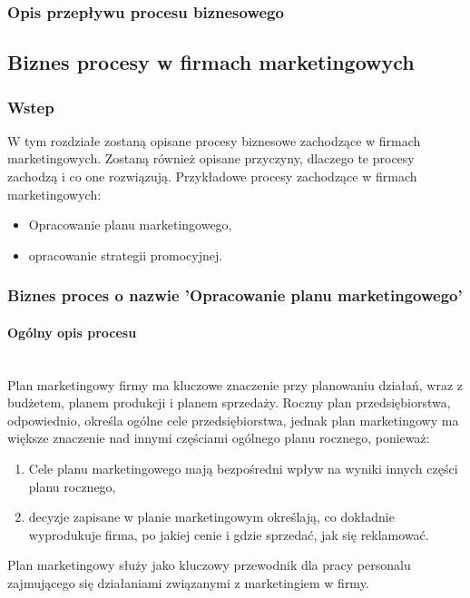 \documentclass[a4paper, 12pt]{article}
\begin{document}
\subsubsection{Opis przepływu procesu biznesowego}






\subsection{Biznes procesy w firmach marketingowych}
\subsubsection{Wstep}
\hspace*{1 cm} W tym rozdziałe zostaną opisane procesy biznesowe zachodzące w firmach marketingowych. Zostaną również opisane przyczyny, dlaczego te procesy zachodzą i co one rozwiązują. Przykładowe procesy zachodzące w firmach marketingowych:
\begin{itemize}
	\item Opracowanie planu marketingowego,
	\item opracowanie strategii promocyjnej.
\end{itemize}
\subsubsection{Biznes proces o nazwie 'Opracowanie planu marketingowego'}
\paragraph{Ogólny opis procesu}\mbox{}\\
\hspace*{1 cm}Plan marketingowy firmy ma kluczowe znaczenie przy planowaniu działań, wraz z budżetem, planem produkcji i planem sprzedaży. Roczny plan przedsiębiorstwa, odpowiednio, określa ogólne cele przedsiębiorstwa, jednak plan marketingowy ma większe znaczenie nad innymi częściami ogólnego planu rocznego, ponieważ:
\begin{enumerate}
	\item Cele planu marketingowego mają bezpośredni wpływ na wyniki innych części planu rocznego,
	\item decyzje zapisane w planie marketingowym określają, co dokładnie wyprodukuje firma, po jakiej cenie i gdzie sprzedać, jak się reklamować.
\end{enumerate}
\hspace*{1 cm}Plan marketingowy służy jako kluczowy przewodnik dla pracy personalu zajmującego się działaniami związanymi z marketingiem w firmy.
\end{document}

